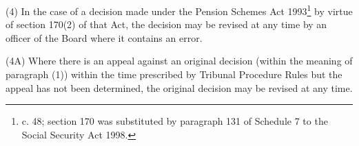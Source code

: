 \documentclass[12pt,a4paper]{article}
\begin{document}
(4) In the case of a decision made under the Pension Schemes Act 1993\footnote{ c. 48; section 170 was substituted by paragraph 131 of Schedule 7 to the Social Security Act 1998.} by virtue of section 170(2) of that Act, the decision may be revised at any time by 
an officer of the Board  %
where it contains an error.

(4A) Where there is an appeal against an original decision (within the meaning of paragraph (1)) within the time prescribed 
by Tribunal Procedure Rules  %
but the appeal has not been determined, the original decision may be revised at any time.
\end{document}
